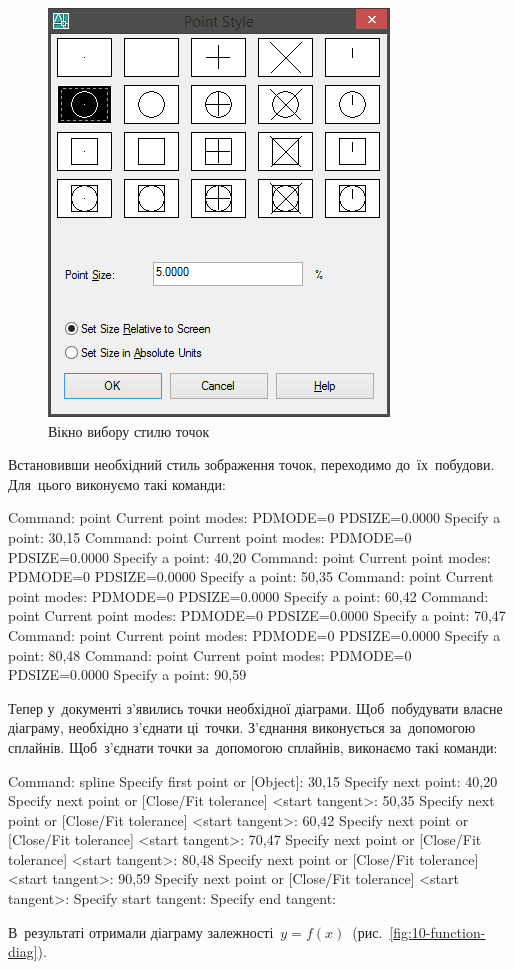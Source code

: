 \documentclass[
	a4paper,
	oneside,
	BCOR = 10mm,
	DIV = 12,
	12pt,
	headings = normal,
]{scrartcl}
\begin{document}
			\begin{figure}[!htbp]
				\centering
				\includegraphics[height=12\baselineskip]{./assets/y04s01-csdt-lab-01-01-p11.png}
				\caption{Вікно вибору стилю точок}
				\label{fig:09-point-style}
			\end{figure}

			Встановивши необхідний стиль зображення точок, переходимо до~їх~побудови. Для~цього виконуємо такі команди:
			\begin{codegeneric}
				Command: point
				Current point modes:  PDMODE=0  PDSIZE=0.0000
				Specify a point: 30,15
				Command: point
				Current point modes:  PDMODE=0  PDSIZE=0.0000
				Specify a point: 40,20
				Command: point
				Current point modes:  PDMODE=0  PDSIZE=0.0000
				Specify a point: 50,35
				Command: point
				Current point modes:  PDMODE=0  PDSIZE=0.0000
				Specify a point: 60,42
				Command: point
				Current point modes:  PDMODE=0  PDSIZE=0.0000
				Specify a point: 70,47
				Command: point
				Current point modes:  PDMODE=0  PDSIZE=0.0000
				Specify a point: 80,48
				Command: point
				Current point modes:  PDMODE=0  PDSIZE=0.0000
				Specify a point: 90,59
			\end{codegeneric}
			Тепер у~документі з'явились точки необхідної діаграми. Щоб~побудувати власне діаграму, необхідно з'єднати ці~точки. З'єднання виконується за~допомогою сплайнів. Щоб~з'єднати точки за~допомогою сплайнів, виконаємо такі команди:
			\begin{codegeneric}
				Command: spline
				Specify first point or [Object]: 30,15
				Specify next point: 40,20
				Specify next point or [Close/Fit tolerance] <start tangent>: 50,35
				Specify next point or [Close/Fit tolerance] <start tangent>: 60,42
				Specify next point or [Close/Fit tolerance] <start tangent>: 70,47
				Specify next point or [Close/Fit tolerance] <start tangent>: 80,48
				Specify next point or [Close/Fit tolerance] <start tangent>: 90,59
				Specify next point or [Close/Fit tolerance] <start tangent>:
				Specify start tangent:
				Specify end tangent:
			\end{codegeneric}
			В~результаті отримали діаграму залежності~$y = f(x)$~(рис.~\ref{fig:10-function-diag}).
\end{document}
